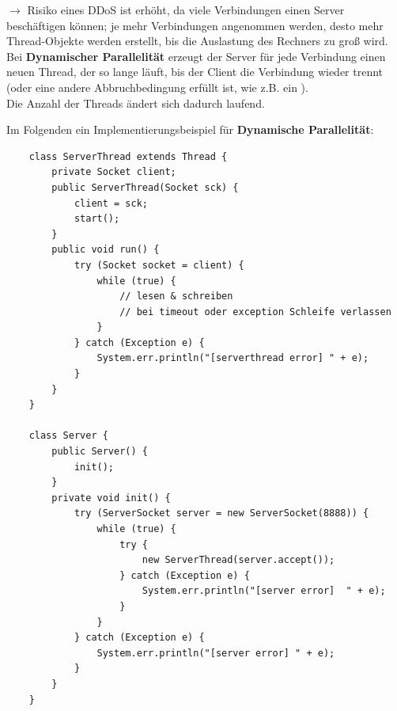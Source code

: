 $\rightarrow$ Risiko eines DDoS ist erhöht, da viele Verbindungen einen Server beschäftigen können; je mehr Verbindungen angenommen werden, desto mehr Thread-Objekte werden erstellt, bis die Auslastung des Rechners zu groß wird.\\

\noindent
Bei \textbf{Dynamischer Parallelität} erzeugt der Server für jede Verbindung einen neuen Thread, der so lange läuft, bis der Client die Verbindung wieder trennt (oder eine andere Abbruchbedingung erfüllt ist, wie z.B. ein ).\\
Die Anzahl der Threads ändert sich dadurch laufend.

\noindent
Im Folgenden ein Implementierungsbeispiel für \textbf{Dynamische Parallelität}:
\begin{verbatim}
    class ServerThread extends Thread {
        private Socket client;
        public ServerThread(Socket sck) {
            client = sck;
            start();
        }
        public void run() {
            try (Socket socket = client) {
                while (true) {
                    // lesen & schreiben
                    // bei timeout oder exception Schleife verlassen
                }
            } catch (Exception e) {
                System.err.println("[serverthread error] " + e);
            }
        }
    }

    class Server {
        public Server() {
            init();
        }
        private void init() {
            try (ServerSocket server = new ServerSocket(8888)) {
                while (true) {
                    try {
                        new ServerThread(server.accept());
                    } catch (Exception e) {
                        System.err.println("[server error]  " + e);
                    }
                }
            } catch (Exception e) {
                System.err.println("[server error] " + e);
            }
        }
    }
\end{verbatim}


